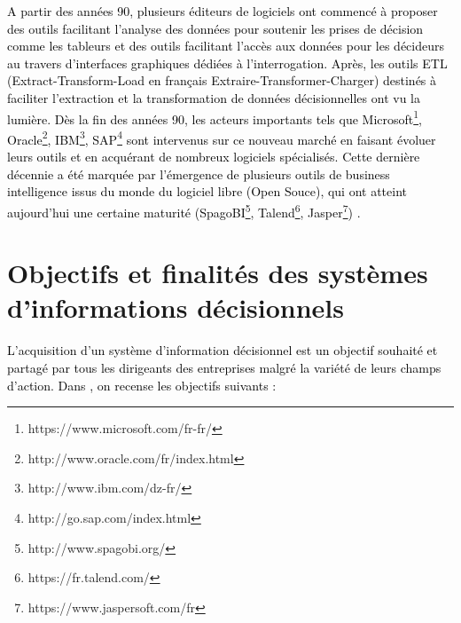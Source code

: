 \documentclass[a4paper,12pt]{report}
\begin{document}
\textcolor{black}{A partir des années 90, plusieurs éditeurs de logiciels ont  commencé à  proposer  des outils facilitant l’analyse des données pour soutenir les prises de décision comme les tableurs et des outils facilitant  l’accès aux données pour les décideurs au travers d’interfaces graphiques dédiées à l’interrogation. Après, les outils ETL (Extract-Transform-Load  en français Extraire-Transformer-Charger) destinés à faciliter l’extraction et la transformation de données décisionnelles ont vu la lumière. Dès la fin des années 90, les acteurs importants tels que Microsoft\footnote{https://www.microsoft.com/fr-fr/}, Oracle\footnote{http://www.oracle.com/fr/index.html}, IBM\footnote{http://www.ibm.com/dz-fr/}, SAP\footnote{http://go.sap.com/index.html} sont intervenus sur ce nouveau marché en faisant évoluer leurs outils et en acquérant de nombreux logiciels spécialisés. Cette dernière décennie a été marquée  par l’émergence de plusieurs outils de business intelligence issus du monde du logiciel libre  (Open Souce),  qui ont atteint aujourd’hui une certaine maturité (SpagoBI\footnote{http://www.spagobi.org/}, Talend\footnote{https://fr.talend.com/}, Jasper\footnote{https://www.jaspersoft.com/fr})  \citep{teste2009modelisation}.}

\section{Objectifs et finalités des systèmes d’informations décisionnels}
\textcolor{black}{L’acquisition d’un système d’information décisionnel est un objectif souhaité et partagé par tous les dirigeants des entreprises malgré la variété de leurs champs d’action. Dans \citep{kimball2013data}, on recense les objectifs suivants :} 
\end{document}
